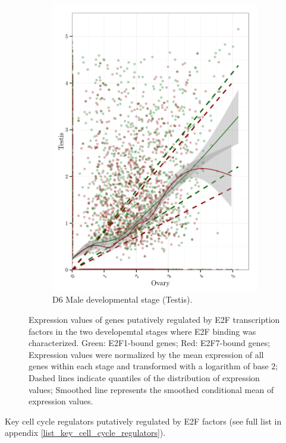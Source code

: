 \documentclass[11pt,twoside,a4paper]{report}
\begin{document}
\begin{figure}
\begin{subfigure}{.5\textwidth}
				\includegraphics[width=1\linewidth]{pngs/E2F_specific_Male_expression.png}
				\caption{D6 Male developmental stage (Testis).}
			\end{subfigure}
			\caption{Expression values of genes putatively regulated by E2F transcription factors in the two developemtal stages where E2F binding was characterized.
			Green: E2F1-bound genes;
			Red: E2F7-bound genes;
				{\footnotesize
				Expression values were normalized by the mean expression of all genes within each stage and transformed with a logarithm of base 2;
				Dashed lines indicate quantiles of the distribution of expression values;
				Smoothed line represents the smoothed conditional mean of expression values.
				}
			}
			\label{fig:E2F_targets_expression}
		\end{figure}
		
		Key cell cycle regulators putatively regulated by E2F factors (see full list in appendix \ref{list_key_cell_cycle_regulators}).
\end{document}

